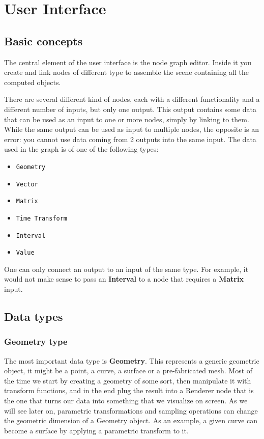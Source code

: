 \section{User Interface}

\subsection{Basic concepts}
The central element of the user interface is the node graph editor. Inside it
you create and link nodes of different type to assemble the scene containing all
the computed objects.

There are several different kind of nodes, each with a different functionality
and a different number of inputs, but only one output. This output contains
some data that can be used as an input to one or more nodes, simply by
linking to them. While the same output can be used as input to multiple nodes,
the opposite is an error: you cannot use data coming from 2 outputs into the same input.
The data used in the graph is of one of the following types:

\begin{itemize}
    \item \texttt{Geometry}
    \item \texttt{Vector}
    \item \texttt{Matrix}
    \item \texttt{Time Transform}
    \item \texttt{Interval}
    \item \texttt{Value}
\end{itemize}

One can only connect an output to an input of the same type. For example, it
would not make sense to pass an \textbf{Interval} to a node that requires
a \textbf{Matrix} input.

\subsection{Data types}
\subsubsection{Geometry type}
The most important data type is \textbf{Geometry}. This represents a generic geometric
object, it might be a point, a curve, a surface or a pre-fabricated mesh.
Most of the time we start by creating a geometry of some sort, then
manipulate it with transform functions, and in the end plug the result
into a Renderer node that is the one that turns our data into something
that we visualize on screen.
As we will see later on, parametric transformations and sampling operations
can change the geometric dimension of a Geometry object. As an example,
a given curve can become a surface by applying a parametric transform to it.

